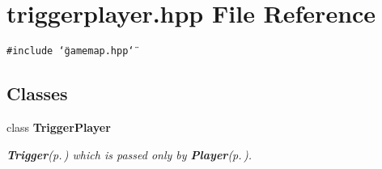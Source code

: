 \section{triggerplayer.hpp File Reference}
\label{triggerplayer_8hpp}
{\tt \#include \char`\"{}gamemap.hpp\char`\"{}}\par
\subsection*{Classes}
\begin{CompactItemize}
\item 
class {\bf Trigger\-Player}
\begin{CompactList}\small\item\em {\bf Trigger}{\rm (p.\,\pageref{classTrigger})} which is passed only by {\bf Player}{\rm (p.\,\pageref{classPlayer})}. \item\end{CompactList}\end{CompactItemize}
